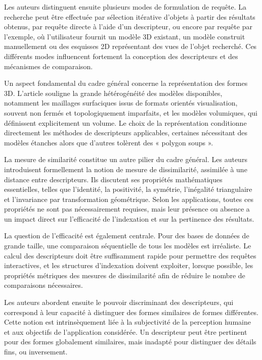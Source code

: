 \documentclass[11pt,a4paper,oneside]{report}
\begin{document}
Les auteurs distinguent ensuite plusieurs modes de formulation de requête. La recherche peut être effectuée par sélection itérative d’objets à partir des résultats obtenus, par requête directe à l’aide d’un descripteur, ou encore par requête par l’exemple, où l’utilisateur fournit un modèle 3D existant, un modèle construit manuellement ou des esquisses 2D représentant des vues de l’objet recherché. Ces différents modes influencent fortement la conception des descripteurs et des mécanismes de comparaison.

Un aspect fondamental du cadre général concerne la représentation des formes 3D. L’article souligne la grande hétérogénéité des modèles disponibles, notamment les maillages surfaciques issus de formats orientés visualisation, souvent non fermés et topologiquement imparfaits, et les modèles volumiques, qui définissent explicitement un volume. Le choix de la représentation conditionne directement les méthodes de descripteurs applicables, certaines nécessitant des modèles étanches alors que d’autres tolèrent des « polygon soups ».

La mesure de similarité constitue un autre pilier du cadre général. Les auteurs introduisent formellement la notion de mesure de dissimilarité, assimilée à une distance entre descripteurs. Ils discutent ses propriétés mathématiques essentielles, telles que l’identité, la positivité, la symétrie, l’inégalité triangulaire et l’invariance par transformation géométrique. Selon les applications, toutes ces propriétés ne sont pas nécessairement requises, mais leur présence ou absence a un impact direct sur l’efficacité de l’indexation et sur la pertinence des résultats.

La question de l’efficacité est également centrale. Pour des bases de données de grande taille, une comparaison séquentielle de tous les modèles est irréaliste. Le calcul des descripteurs doit être suffisamment rapide pour permettre des requêtes interactives, et les structures d’indexation doivent exploiter, lorsque possible, les propriétés métriques des mesures de dissimilarité afin de réduire le nombre de comparaisons nécessaires.

Les auteurs abordent ensuite le pouvoir discriminant des descripteurs, qui correspond à leur capacité à distinguer des formes similaires de formes différentes. Cette notion est intrinsèquement liée à la subjectivité de la perception humaine et aux objectifs de l’application considérée. Un descripteur peut être pertinent pour des formes globalement similaires, mais inadapté pour distinguer des détails fins, ou inversement.
\end{document}
